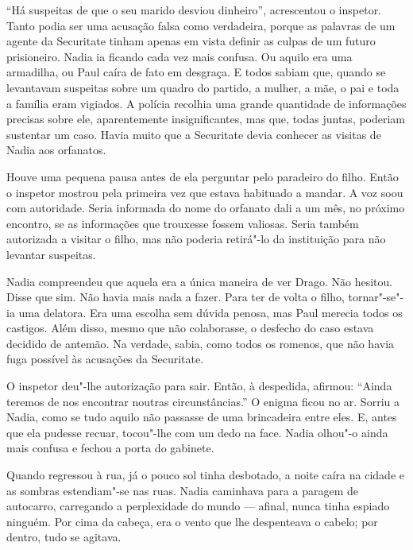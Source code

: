 ``Há suspeitas de que o seu marido desviou dinheiro'',
acrescentou o inspetor. Tanto podia ser uma acusação falsa como
verdadeira, porque as palavras de um agente da Securitate tinham apenas
em vista definir as culpas de um futuro prisioneiro. Nadia ia ficando
cada vez mais confusa. Ou aquilo era uma armadilha, ou Paul caíra de
fato em desgraça. E todos sabiam que, quando se levantavam suspeitas
sobre um quadro do partido, a mulher, a
mãe, o pai e toda a família eram vigiados. A polícia recolhia uma
grande quantidade de informações precisas sobre ele, aparentemente
insignificantes, mas que, todas juntas, poderiam sustentar um caso.
Havia muito que a Securitate devia conhecer as visitas de Nadia aos
orfanatos.

Houve uma pequena pausa antes de ela perguntar pelo paradeiro do filho.
Então o inspetor mostrou pela primeira vez que estava habituado a
mandar. A voz soou com autoridade. Seria informada do nome do orfanato
dali a um mês, no próximo encontro, se as informações que trouxesse
fossem valiosas. Seria também autorizada a visitar o filho, mas não
poderia retirá"-lo da instituição para não levantar suspeitas.

Nadia compreendeu que aquela era a única maneira de ver Drago. Não
hesitou. Disse que sim. Não havia mais nada a fazer. Para ter de volta o
filho, tornar"-se"-ia uma delatora. Era uma escolha sem dúvida penosa, mas
Paul merecia todos os castigos. Além disso, mesmo que não colaborasse, o
desfecho do caso estava decidido de antemão. Na verdade, sabia, como
todos os romenos, que não havia fuga possível às acusações da
Securitate.

O inspetor deu"-lhe autorização para sair. Então, à despedida,
afirmou: ``Ainda teremos de nos encontrar noutras circunstâncias.'' O
enigma ficou no ar. Sorriu a Nadia, como se tudo aquilo não passasse de
uma brincadeira entre eles. E, antes que ela pudesse recuar, tocou"-lhe
com um dedo na face. Nadia olhou"-o ainda mais confusa e fechou a porta
do gabinete.

Quando regressou à rua, já o pouco sol tinha desbotado, a noite caíra
na cidade e as sombras estendiam"-se nas
ruas. Nadia caminhava para a paragem de autocarro, carregando a
perplexidade do mundo --- afinal, nunca tinha espiado ninguém. Por cima
da cabeça, era o vento que lhe despenteava o cabelo; por dentro, tudo se
agitava.


